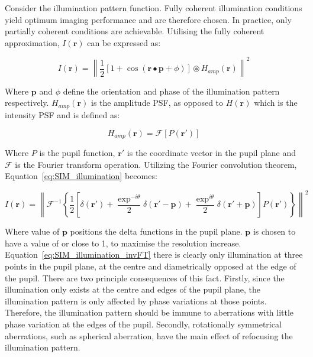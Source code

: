 Consider the illumination pattern function. Fully coherent
illumination conditions yield optimum imaging performance and
are therefore chosen. In practice, only partially coherent 
conditions are achievable. Utilising the fully coherent 
approximation, $I(\textbf{r})$ can be expressed as:

\begin{equation}\label{eq:SIM_illumination}
I(\textbf{r}) = \left\| \frac{1}{2}[1 + \cos(\textbf{r}\bullet\textbf{p} + \phi)]\circledast H_{amp}(\textbf{r}) \right\|^{2}
\end{equation}

Where $\textbf{p}$ and $\phi$ define the orientation and phase of
the illumination pattern respectively. $H_{amp}(\textbf{r})$ is the
amplitude PSF, as opposed to $H(\textbf{r})$ which is the intensity
PSF and is defined as:

\begin{equation}\label{eq:amplitude_PSF}
H_{amp}(\textbf{r}) = \mathcal{F}[P(\textbf{r}')]
\end{equation}

Where $P$ is the pupil function, $\textbf{r}'$ is the coordinate
vector in the pupil plane and $\mathcal{F}$ is the Fourier
transform operation. Utilizing the Fourier convolution 
theorem, Equation~\ref{eq:SIM_illumination} becomes:

\begin{equation}\label{eq:SIM_illumination_invFT}
I(\textbf{r}) = \left\| \mathcal{F}^{-1}\left\{\frac{1}{2}\left[\delta(\textbf{r}') + \frac{\exp^{-i\theta}}{2}\delta(\textbf{r}'-\textbf{p}) + \frac{\exp^{i\theta}}{2}\delta(\textbf{r}'+\textbf{p})\right]P(\textbf{r}')\right\} \right\|^{2}
\end{equation}

Where value of $\textbf{p}$ positions the delta functions in the
pupil plane. $\textbf{p}$ is chosen to have a value of or close
to 1, to maximise the resolution increase. 
Equation~\ref{eq:SIM_illumination_invFT} there is clearly only
illumination at three points in the pupil plane, at the centre 
and diametrically opposed at the edge of the pupil. There are
two principle consequences of this fact. Firstly, since the 
illumination only exists at the centre and edges of the pupil
plane, the illumination pattern is only affected by phase 
variations at those points. Therefore, the illumination pattern
should be immune to aberrations with little phase variation at 
the edges of the pupil. Secondly, rotationally symmetrical 
aberrations, such as spherical aberration, have the main
effect of refocusing the illumination pattern\cite{booth2015aberrations}.

